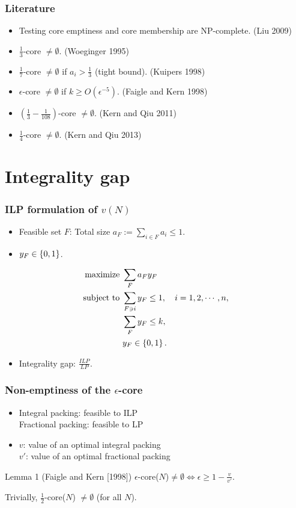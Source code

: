 \documentclass{beamer}
\begin{document}
\begin{frame}\frametitle{Literature}
  \begin{itemize}
    \item Testing core emptiness and core membership are NP-complete. (Liu 2009)
    \item<2-> $\frac{1}{3}$-core $\neq\emptyset$. (Woeginger 1995)
	  \item<3-> $\frac{1}{7}$-core $\neq\emptyset$ if $a_i>\frac{1}{3}$ (tight bound). (Kuipers 1998)
	  \item<4-> $\epsilon$-core $\neq \emptyset$ if $k\geq O(\epsilon^{-5})$. (Faigle and Kern 1998)
	  \item<5-> $(\frac{1}{3}-\frac{1}{108})$-core $\neq \emptyset$. (Kern and Qiu 2011)
	  \item<6-> $\frac{1}{4}$-core $\neq\emptyset$. (Kern and Qiu 2013)
  \end{itemize}
  \pause
\end{frame}

\section{Integrality gap}
\begin{frame}\frametitle{ILP formulation of $v(N)$}
  \begin{itemize}
     \item Feasible set $F$: Total size $a_F:=\sum_{i\in F}a_i\leq 1$.
     \item<2-> $y_F \in \left\{0,1\right\}$.
  \end{itemize}
  \pause[3]
  \begin{align*}
    \text{maximize }   & \sum_{F}a_Fy_F\\
    \text{subject to } & \sum_{F\ni i}y_F\leq 1, \quad i=1,2,\cdots,n,\\
                       & \sum_{F}y_F \leq k,\\
                       & y_F\in\left\{0,1\right\}.
  \end{align*}
  \begin{itemize}
    \item<4-> Integrality gap: $\frac{ILP}{LP}$.
  \end{itemize}
\end{frame}

\begin{frame}\frametitle{Non-emptiness of the $\epsilon$-core}
  \begin{itemize}
    \item Integral packing: feasible to ILP\\
          Fractional packing: feasible to LP
    \item<2-> $v$: value of an optimal integral packing\\
              $v'$: value of an optimal fractional packing
  \end{itemize}
\pause[3]
\begin{block}{Lemma 1 (Faigle and Kern [1998])}
$\epsilon$-core($N$)$\neq\emptyset \Leftrightarrow \epsilon\geq 1-\frac{v}{v'}$.
\end{block}
\pause[4]
Trivially, $\frac{1}{2}$-core($N$) $\neq\emptyset$ (for all $N$).
\end{frame}
\end{document}
